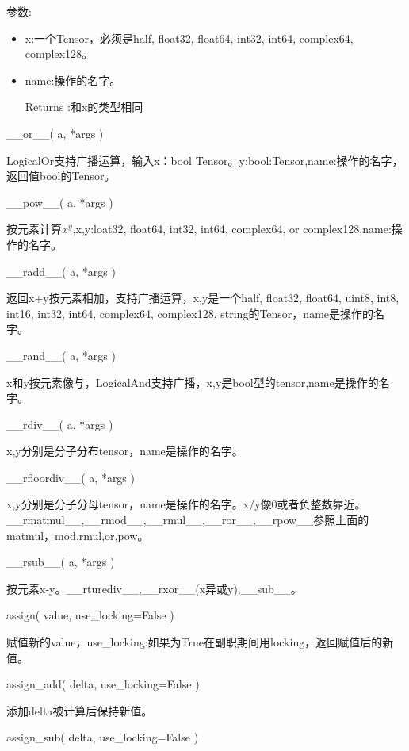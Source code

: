 参数:
\begin{itemize}
	\item x:一个Tensor，必须是half, float32, float64, int32, int64, complex64, complex128。
	\item name:操作的名字。
	\item[Returns]:和x的类型相同
\end{itemize}
\begin{python}
__or__(
    a,
    *args
)
\end{python}
LogicalOr支持广播运算，输入x：bool Tensor。y:bool:Tensor,name:操作的名字，返回值bool的Tensor。
\begin{python}
__pow__(
    a,
    *args
)
\end{python}
按元素计算$x^y$,x,y:loat32, float64, int32, int64, complex64, or complex128,name:操作的名字。
\begin{python}
__radd__(
    a,
    *args
)
\end{python}
返回x+y按元素相加，支持广播运算，x,y是一个half, float32, float64, uint8, int8, int16, int32, int64, complex64, complex128, string的Tensor，name是操作的名字。
\begin{python}
__rand__(
    a,
    *args
)
\end{python}
x和y按元素像与，LogicalAnd支持广播，x,y是bool型的tensor,name是操作的名字。
\begin{python}
__rdiv__(
    a,
    *args
)
\end{python}
x,y分别是分子分布tensor，name是操作的名字。
\begin{python}
__rfloordiv__(
    a,
    *args
)
\end{python}
x,y分别是分子分母tensor，name是操作的名字。x/y像0或者负整数靠近。
\_\_rmatmul\_\_,\_\_rmod\_\_,\_\_rmul\_\_,\_\_ror\_\_,\_\_rpow\_\_参照上面的matmul，mod,rmul,or,pow。
\begin{python}
__rsub__(
    a,
    *args
)
\end{python}
按元素x-y。\_\_rturediv\_\_,\_\_rxor\_\_(x异或y),\_\_sub\_\_。
\begin{python}
assign(
    value,
    use_locking=False
)
\end{python}
赋值新的value，use\_locking:如果为True在副职期间用locking，返回赋值后的新值。
\begin{python}
assign_add(
    delta,
    use_locking=False
)
\end{python}
添加delta被计算后保持新值。
\begin{python}
assign_sub(
    delta,
    use_locking=False
)
\end{python}
